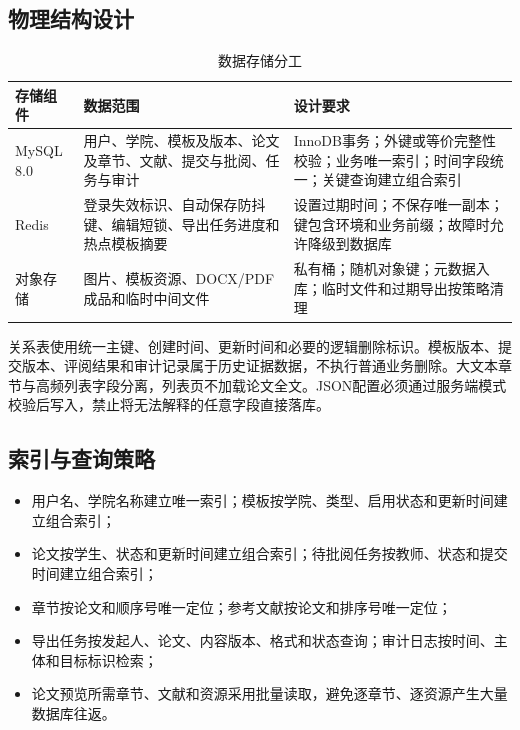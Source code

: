 \documentclass{../template/softeng}
\begin{document}
	\subsection{物理结构设计}
	\begin{table}[htbp]
		\centering
		\small
		\caption{数据存储分工}
		\begin{tabular}{p{2.4cm}p{4.2cm}p{5.4cm}}
			\toprule
			存储组件 & 数据范围 & 设计要求 \\
			\midrule
			MySQL 8.0 & 用户、学院、模板及版本、论文及章节、文献、提交与批阅、任务与审计 & InnoDB事务；外键或等价完整性校验；业务唯一索引；时间字段统一；关键查询建立组合索引 \\
			Redis & 登录失效标识、自动保存防抖键、编辑短锁、导出任务进度和热点模板摘要 & 设置过期时间；不保存唯一副本；键包含环境和业务前缀；故障时允许降级到数据库 \\
			对象存储 & 图片、模板资源、DOCX/PDF成品和临时中间文件 & 私有桶；随机对象键；元数据入库；临时文件和过期导出按策略清理 \\
			\bottomrule
		\end{tabular}
	\end{table}
	
	关系表使用统一主键、创建时间、更新时间和必要的逻辑删除标识。模板版本、提交版本、评阅结果和审计记录属于历史证据数据，不执行普通业务删除。大文本章节与高频列表字段分离，列表页不加载论文全文。JSON配置必须通过服务端模式校验后写入，禁止将无法解释的任意字段直接落库。
	
	\subsection{索引与查询策略}
	\begin{itemize}
		\item 用户名、学院名称建立唯一索引；模板按学院、类型、启用状态和更新时间建立组合索引；
		\item 论文按学生、状态和更新时间建立组合索引；待批阅任务按教师、状态和提交时间建立组合索引；
		\item 章节按论文和顺序号唯一定位；参考文献按论文和排序号唯一定位；
		\item 导出任务按发起人、论文、内容版本、格式和状态查询；审计日志按时间、主体和目标标识检索；
		\item 论文预览所需章节、文献和资源采用批量读取，避免逐章节、逐资源产生大量数据库往返。
	\end{itemize}
	
\end{document}
